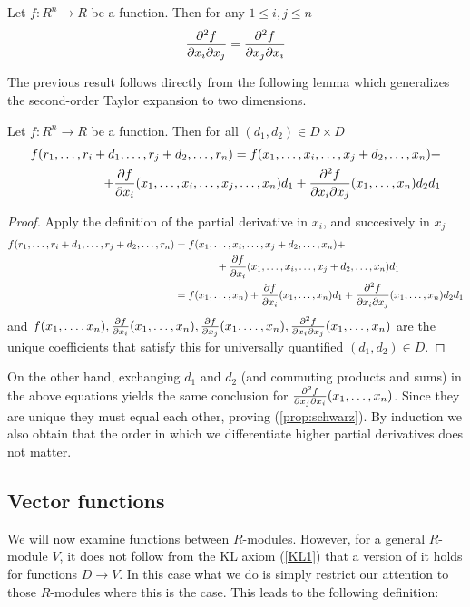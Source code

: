 \begin{proposition}
  Let \( f:R^n\to R \) be a function. Then for any \( 1\leq i,j\leq n \)
  \begin{equation*}
    \frac{\partial^{2} f}{\partial x_i \partial x_j}= \frac{\partial^{2} f}{\partial x_j \partial x_i}
  \end{equation*}
  \label{prop:schwarz}
\end{proposition}
The previous result follows directly from the following lemma which generalizes the second-order Taylor expansion to two dimensions.
\begin{lemma}
  Let \( f:R^n \to R \) be a function. Then for all \( (d_1,d_2)\in D\times D \)
  \begin{align*}
    f(r_1,\dots,r_i+d_1,\dots,r_j+d_2,\dots,r_n) = f(x_1,\dots,x_i,\dots,x_j+d_2,\dots,x_n) + \\
    \qquad + \frac{\partial f}{\partial x_i}(x_1,\dots,x_i,\dots,x_j,\dots,x_n)d_1 + \frac{\partial^{2} f}{\partial x_i \partial x_j}(x_1,\dots,x_n)d_2d_1 
  \end{align*}
\end{lemma}

\begin{proof}
  Apply the definition of the partial derivative in \( x_i \), and succesively in \( x_j \)
  \begin{align*}
    f(r_1,\dots,r_i+d_1,\dots,r_j+d_2,\dots,r_n) & = f(x_1,\dots,x_i,\dots,x_j+d_2,\dots,x_n) + \\
                                                 & \qquad\qquad + \frac{\partial f}{\partial x_i}(x_1,\dots,x_i,\dots,x_j+d_2,\dots,x_n)d_1 \\
                                                 & = f(x_1,\dots,x_n) + \frac{\partial f}{\partial x_i}(x_1,\dots,x_n)d_1 + \frac{\partial^{2} f}{\partial x_i \partial x_j}(x_1,\dots,x_n)d_2d_1
  \end{align*}
  and \( f(x_1,\dots,x_n), \frac{\partial f}{\partial x_i}(x_1,\dots,x_n), \frac{\partial f}{\partial x_j}(x_1,\dots,x_n), \frac{\partial^{2} f}{\partial x_i \partial x_j}(x_1,\dots,x_n)  \) are the unique coefficients that satisfy this for universally quantified \( (d_1,d_2)\in D \).
\end{proof}

On the other hand, exchanging \( d_1 \) and \( d_2 \) (and commuting products and sums) in the above equations yields the same conclusion for \( \frac{\partial^{2} f}{\partial x_j \partial x_i}(x_1,\dots,x_n) \). Since they are unique they must equal each other, proving (\ref{prop:schwarz}). By induction we also obtain that the order in which we differentiate higher partial derivatives does not matter.

\subsection{Vector functions}
We will now examine functions between \( R \)-modules. However, for a general \( R \)-module \( V \), it does not follow from the KL axiom (\ref{KL1}) that a version of it holds for functions \( D\to V \). In this case what we do is simply restrict our attention to those \( R \)-modules where this is the case. This leads to the following definition:

